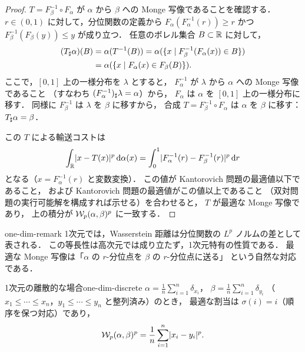 \begin{proof}
  $T = F_\beta^{-1} \circ F_\alpha$ が $\alpha$ から $\beta$ への Monge 写像であることを確認する．
  $r \in (0, 1)$ に対して，分位関数の定義から
  $F_\alpha(F_\alpha^{-1}(r)) \geq r$ かつ $F_\beta^{-1}(F_\beta(y)) \leq y$ が成り立つ．
  任意のボレル集合 $B \subset \mathbb{R}$ に対して，
  \begin{align*}
    (T_\sharp \alpha)(B)
    &= \alpha(T^{-1}(B))
    = \alpha(\{x \mid F_\beta^{-1}(F_\alpha(x)) \in B\}) \\
    &= \alpha(\{x \mid F_\alpha(x) \in F_\beta(B)\}).
  \end{align*}
  ここで，$[0, 1]$ 上の一様分布を $\lambda$ とすると，
  $F_\alpha^{-1}$ が $\lambda$ から $\alpha$ への Monge 写像であること
  （すなわち $(F_\alpha^{-1})_\sharp \lambda = \alpha$）から，
  $F_\alpha$ は $\alpha$ を $[0,1]$ 上の一様分布に移す．
  同様に $F_\beta^{-1}$ は $\lambda$ を $\beta$ に移すから，
  合成 $T = F_\beta^{-1} \circ F_\alpha$ は $\alpha$ を $\beta$ に移す：
  $T_\sharp \alpha = \beta$．

  この $T$ による輸送コストは
  \[
    \int_{\mathbb{R}} \lvert x - T(x) \rvert^p \, \mathrm{d}\alpha(x)
    = \int_0^1 \lvert F_\alpha^{-1}(r) - F_\beta^{-1}(r) \rvert^p \, \mathrm{d} r
  \]
  となる（$x = F_\alpha^{-1}(r)$ と変数変換）．
  この値が Kantorovich 問題の最適値以下であること，
  および Kantorovich 問題の最適値がこの値以上であること
  （双対問題の実行可能解を構成すれば示せる）を合わせると，
  $T$ が最適な Monge 写像であり，
  上の積分が $\mathcal{W}_p(\alpha, \beta)^p$ に一致する．
\end{proof}

\begin{remark}{}{one-dim-remark}
  1次元では，Wasserstein 距離は分位関数の $L^p$ ノルムの差として表される．
  この等長性は高次元では成り立たず，1次元特有の性質である．
  最適な Monge 写像は「$\alpha$ の $r$-分位点を $\beta$ の $r$-分位点に送る」
  という自然な対応である．
\end{remark}

\begin{example}{1次元の離散的な場合}{one-dim-discrete}
  $\alpha = \frac{1}{n}\sum_{i=1}^n \delta_{x_i}$，
  $\beta = \frac{1}{n}\sum_{i=1}^n \delta_{y_i}$
  （$x_1 \leq \cdots \leq x_n$，$y_1 \leq \cdots \leq y_n$ と整列済み）のとき，
  最適な割当は $\sigma(i) = i$（順序を保つ対応）であり，
  \[
    \mathcal{W}_p(\alpha, \beta)^p = \frac{1}{n} \sum_{i=1}^n \lvert x_i - y_i \rvert^p.
  \]
\end{example}

